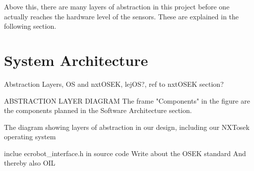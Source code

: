 Above this, there are many layers of abstraction in this project before one actually reaches the hardware level of the sensors. These are explained in the following section. 

\section{System Architecture}

Abstraction Layers, OS and nxtOSEK, lejOS?, ref to nxtOSEK section?

ABSTRACTION LAYER DIAGRAM
The frame "Components" in the figure are the components planned in the Software Architecture section. 

The diagram showing layers of abstraction in our design, including our NXTosek operating system

inclue ecrobot\_interface.h in source code
Write about the OSEK standard
And thereby also OIL



%

